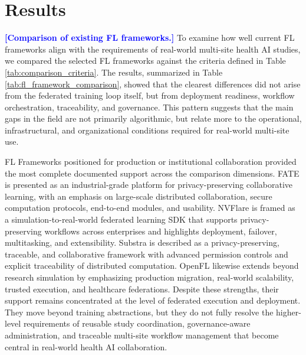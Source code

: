 \documentclass[preprint,5p, 10pt, times]{elsarticle}
\begin{document}


\section*{Results}

\textcolor{blue}{\textbf{[Comparison of existing FL frameworks.]}}
To examine how well current FL frameworks align with the requirements of real-world multi-site health AI studies, we compared the selected FL frameworks against the criteria defined in Table \ref{tab:comparison_criteria}. The results, summarized in Table \ref{tab:fl_framework_comparison}, showed that the clearest differences did not arise from the federated training loop itself, but from deployment readiness, workflow orchestration, traceability, and governance.
This pattern suggests that the main gaps in the field are not primarily algorithmic, but relate more to the operational, infrastructural, and organizational conditions required for real-world multi-site use.

FL Frameworks positioned for production or institutional collaboration provided the most complete documented support across the comparison dimensions. 
FATE is presented as an industrial-grade platform for privacy-preserving collaborative learning, with an emphasis on large-scale distributed collaboration, secure computation protocols, end-to-end modules, and usability\cite{liu2021fate}. 
NVFlare is framed as a simulation-to-real-world federated learning SDK that supports privacy-preserving workflows across enterprises and highlights deployment, failover, multitasking, and extensibility\cite{roth2022nvidia}. 
Substra is described as a privacy-preserving, traceable, and collaborative framework with advanced permission controls and explicit traceability of distributed computation\cite{galtier2019substra}. 
OpenFL likewise extends beyond research simulation by emphasizing production migration, real-world scalability, trusted execution, and healthcare federations\cite{reina2021openfl}. 
Despite these strengths, their support remains concentrated at the level of federated execution and deployment. They move beyond training abstractions, but they do not fully resolve the higher-level requirements of reusable study coordination, governance-aware administration, and traceable multi-site workflow management that become central in real-world health AI collaboration.
\end{document}
